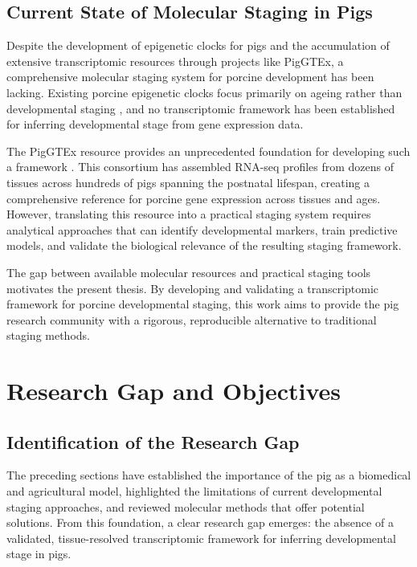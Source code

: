 \subsection{Current State of Molecular Staging in Pigs}

Despite the development of epigenetic clocks for pigs and the accumulation of extensive transcriptomic resources through projects like PigGTEx, a comprehensive molecular staging system for porcine development has been lacking. Existing porcine epigenetic clocks focus primarily on ageing rather than developmental staging \parencite{schachtschneider_epigenetic_2021}, and no transcriptomic framework has been established for inferring developmental stage from gene expression data.

The PigGTEx resource provides an unprecedented foundation for developing such a framework \parencite{teng_compendium_2024, chen_construction_2025}. This consortium has assembled RNA-seq profiles from dozens of tissues across hundreds of pigs spanning the postnatal lifespan, creating a comprehensive reference for porcine gene expression across tissues and ages. However, translating this resource into a practical staging system requires analytical approaches that can identify developmental markers, train predictive models, and validate the biological relevance of the resulting staging framework.

The gap between available molecular resources and practical staging tools motivates the present thesis. By developing and validating a transcriptomic framework for porcine developmental staging, this work aims to provide the pig research community with a rigorous, reproducible alternative to traditional staging methods.


\section{Research Gap and Objectives}\label{sec:intro:gap}

\subsection{Identification of the Research Gap}

The preceding sections have established the importance of the pig as a biomedical and agricultural model, highlighted the limitations of current developmental staging approaches, and reviewed molecular methods that offer potential solutions. From this foundation, a clear research gap emerges: the absence of a validated, tissue-resolved transcriptomic framework for inferring developmental stage in pigs.


